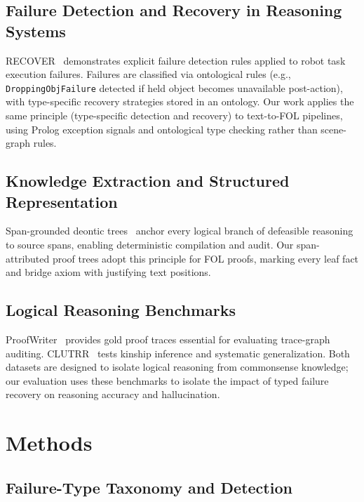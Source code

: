 \documentclass[11pt,letterpaper]{article}
\begin{document}
\subsection{Failure Detection and Recovery in Reasoning Systems}

RECOVER~\citep{Cornelio2024} demonstrates explicit failure detection rules applied to robot task execution failures. Failures are classified via ontological rules (e.g., \texttt{DroppingObjFailure} detected if held object becomes unavailable post-action), with type-specific recovery strategies stored in an ontology. Our work applies the same principle (type-specific detection and recovery) to text-to-FOL pipelines, using Prolog exception signals and ontological type checking rather than scene-graph rules.

\subsection{Knowledge Extraction and Structured Representation}

Span-grounded deontic trees~\citep{Chen2026} anchor every logical branch of defeasible reasoning to source spans, enabling deterministic compilation and audit. Our span-attributed proof trees adopt this principle for FOL proofs, marking every leaf fact and bridge axiom with justifying text positions.

\subsection{Logical Reasoning Benchmarks}

ProofWriter~\citep{Tafjord2020} provides gold proof traces essential for evaluating trace-graph auditing. CLUTRR~\citep{Sinha2019} tests kinship inference and systematic generalization. Both datasets are designed to isolate logical reasoning from commonsense knowledge; our evaluation uses these benchmarks to isolate the impact of typed failure recovery on reasoning accuracy and hallucination.

\section{Methods}
\label{sec:methods}

\subsection{Failure-Type Taxonomy and Detection}
\end{document}
